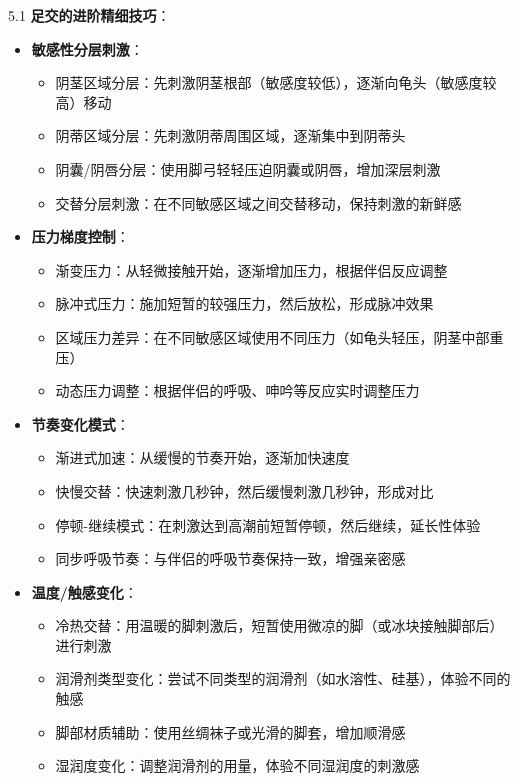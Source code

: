 \documentclass[12pt,UTF8]{ctexbook}
\begin{document}
5.1 \textbf{足交的进阶精细技巧}：
\begin{itemize}
	\item \textbf{敏感性分层刺激}：
	\begin{itemize}
		\item 阴茎区域分层：先刺激阴茎根部（敏感度较低），逐渐向龟头（敏感度较高）移动
		\item 阴蒂区域分层：先刺激阴蒂周围区域，逐渐集中到阴蒂头
		\item 阴囊/阴唇分层：使用脚弓轻轻压迫阴囊或阴唇，增加深层刺激
		\item 交替分层刺激：在不同敏感区域之间交替移动，保持刺激的新鲜感
	\end{itemize}
	\item \textbf{压力梯度控制}：
	\begin{itemize}
		\item 渐变压力：从轻微接触开始，逐渐增加压力，根据伴侣反应调整
		\item 脉冲式压力：施加短暂的较强压力，然后放松，形成脉冲效果
		\item 区域压力差异：在不同敏感区域使用不同压力（如龟头轻压，阴茎中部重压）
		\item 动态压力调整：根据伴侣的呼吸、呻吟等反应实时调整压力
	\end{itemize}
	\item \textbf{节奏变化模式}：
	\begin{itemize}
		\item 渐进式加速：从缓慢的节奏开始，逐渐加快速度
		\item 快慢交替：快速刺激几秒钟，然后缓慢刺激几秒钟，形成对比
		\item 停顿-继续模式：在刺激达到高潮前短暂停顿，然后继续，延长性体验
		\item 同步呼吸节奏：与伴侣的呼吸节奏保持一致，增强亲密感
	\end{itemize}
	\item \textbf{温度/触感变化}：
	\begin{itemize}
		\item 冷热交替：用温暖的脚刺激后，短暂使用微凉的脚（或冰块接触脚部后）进行刺激
		\item 润滑剂类型变化：尝试不同类型的润滑剂（如水溶性、硅基），体验不同的触感
		\item 脚部材质辅助：使用丝绸袜子或光滑的脚套，增加顺滑感
		\item 湿润度变化：调整润滑剂的用量，体验不同湿润度的刺激感
	\end{itemize}
\end{itemize}
\end{document}
